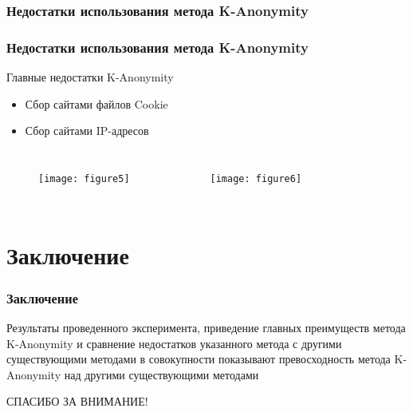 \documentclass[handout]{beamer}
\begin{document}
\subsubsection{Недостатки использования метода K-Anonymity}
\begin{frame}
    \frametitle{Недостатки использования метода K-Anonymity}

    \begin{block}{Главные недостатки K-Anonymity}
        \begin{itemize}
            \item Сбор сайтами файлов Cookie
            \item Сбор сайтами IP-адресов
        \end{itemize}
    \end{block}

    \begin{columns}
        \begin{figure}[ht!]
       \texttt{[image: figure5]}
       \label{fig:5}
   \end{figure}

   \begin{figure}[ht!]
       \texttt{[image: figure6]}
       \label{fig:6}
   \end{figure}
    \end{columns}
\end{frame}

\section{Заключение}
\begin{frame}
    \frametitle{Заключение}
    
    Результаты проведенного эксперимента, приведение главных преимуществ метода K-Anonymity и сравнение недостатков указанного метода с другими существующими методами в совокупности показывают превосходность метода K-Anonymity над другими существующими методами
\end{frame}

\begin{frame}
    \begin{center}
        \Huge{СПАСИБО ЗА ВНИМАНИЕ!}
    \end{center}
\end{frame}
\end{document}
